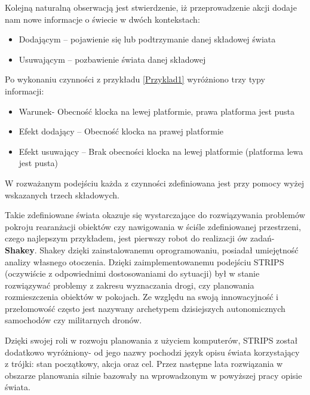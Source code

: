     Kolejną naturalną obserwacją jest stwierdzenie, iż przeprowadzenie akcji dodaje nam nowe informacje o świecie w dwóch kontekstach:
    \begin{itemize}
        \item Dodającym -- pojawienie się lub podtrzymanie danej składowej świata
        \item Usuwającym -- pozbawienie świata danej składowej
    \end{itemize}
    Po wykonaniu czynności z przykładu \ref{Przyklad1} wyróżniono trzy typy informacji:
    \begin{itemize}
        \item Warunek- Obecność klocka na lewej platformie, prawa platforma jest pusta
        \item Efekt dodający -- Obecność klocka na prawej platformie
        \item Efekt usuwający -- Brak obecności klocka na lewej platformie (platforma lewa jest pusta)
    \end{itemize}
    W rozważanym podejściu każda z czynności zdefiniowana jest przy pomocy wyżej wskazanych trzech składowych.

        Takie zdefiniowane świata okazuje się wystarczające do rozwiązywania problemów pokroju rearanżacji obiektów czy 
    nawigowania w ściśle zdefiniowanej przestrzeni, czego najlepszym przykładem, jest pierwszy robot do realizacji ów zadań- \textbf{Shakey}.
    Shakey dzięki zainstalowanemu oprogramowaniu,
    posiadał umiejętność analizy własnego otoczenia. Dzięki zaimplementowanemu podejściu 
    STRIPS (oczywiście z odpowiednimi dostosowaniami do sytuacji) był w stanie rozwiązywać problemy z zakresu wyznaczania drogi,
    czy planowania rozmieszczenia obiektów w pokojach.
    Ze względu na swoją innowacyjność i przełomowość często jest nazywany archetypem
    dzisiejszych autonomicznych samochodów czy militarnych dronów.

    Dzięki swojej roli w rozwoju planowania z użyciem komputerów, STRIPS został dodatkowo wyróżniony- od jego nazwy pochodzi język opisu świata korzystający
    z trójki: stan początkowy, akcja oraz cel. Przez następne lata rozwiązania w obszarze planowania silnie bazowały na wprowadzonym w powyższej pracy opisie świata.

